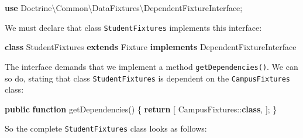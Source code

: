 \documentclass[a4paperpaper,openright]{book}
\newenvironment{Shaded}{}{}
\newcommand{\KeywordTok}[1]{\textcolor[rgb]{0.00,0.44,0.13}{\textbf{#1}}}
\newcommand{\NormalTok}[1]{#1}
\newcommand{\OtherTok}[1]{\textcolor[rgb]{0.00,0.44,0.13}{#1}}
\begin{document}
\begin{Shaded}
\begin{Highlighting}[]
    \KeywordTok{use}\NormalTok{ Doctrine\textbackslash{}Common\textbackslash{}DataFixtures\textbackslash{}DependentFixtureInterface}\OtherTok{;}
\end{Highlighting}
\end{Shaded}

We must declare that class \texttt{StudentFixtures} implements this
interface:

\begin{Shaded}
\begin{Highlighting}[]
    \KeywordTok{class}\NormalTok{ StudentFixtures }\KeywordTok{extends}\NormalTok{ Fixture }\KeywordTok{implements}\NormalTok{ DependentFixtureInterface}
\end{Highlighting}
\end{Shaded}

The interface demands that we implement a method
\texttt{getDependencies()}. We can so do, stating that class
\texttt{StudentFixtures} is dependent on the \texttt{CampusFixtures}
class:

\begin{Shaded}
\begin{Highlighting}[]
    \KeywordTok{public} \KeywordTok{function}\NormalTok{ getDependencies}\OtherTok{()}
\NormalTok{    \{}
        \KeywordTok{return} \OtherTok{[}
\NormalTok{            CampusFixtures::}\KeywordTok{class}\OtherTok{,}
        \OtherTok{];}
\NormalTok{    \}}
\end{Highlighting}
\end{Shaded}

So the complete \texttt{StudentFixtures} class looks as follows:
\end{document}
